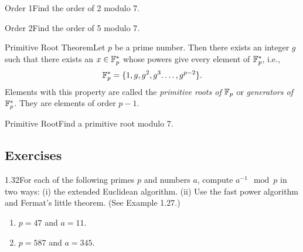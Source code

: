 \begin{example}
    {Order 1}Find the order of 2 modulo 7.
\end{example}


\begin{example}
    {Order 2}Find the order of 5 modulo 7.
\end{example}


\begin{theorem}
    {Primitive Root Theorem}Let \(p\) be a prime number. Then there exists an integer \(g\) such that there exists an \(x \in \mathbb{F}_p^*\) whose powers give every element of \(\mathbb{F}_p^*\), i.e., \[\mathbb{F}_p^* = \{1,g,g^2,g^3.\dots,g^{p - 2}\}.\] Elements with this property are called the \textit{primitive roots of} \(\mathbb{F}_p\) or \textit{generators of} \(\mathbb{F}_p^*\). They are elements of order \(p - 1\).
\end{theorem}

\begin{example}
    {Primitive Root}Find a primitive root modulo 7.
\end{example}


\renewcommand{\theenumi}{\alph{enumi}}
\renewcommand{\labelenumi}{(\theenumi)}
\subsection{Exercises}

\begin{exercise}
    {1.32}For each of the following primes \( p \) and numbers \( a \), compute \( a^{-1} \mod p \) in two ways: (i) the extended Euclidean algorithm. (ii) Use the fast power algorithm and Fermat's little theorem. (See Example 1.27.)
    \begin{enumerate}
        \item \( p = 47 \) and \( a = 11 \).
        \item \( p = 587 \) and \( a = 345 \).
    \end{enumerate}
\end{exercise}

